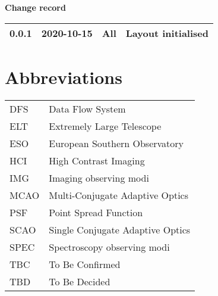 
\dmdmaketitle


\begin{center}
  \textbf{Change record}

  \tabletail{\hline}

  \begin{supertabular}{|l|l|l|l|}
   0.0.1 & 2020-10-15 & All & Layout initialised \\
   \hline
  \end{supertabular}

\end{center}


\setcounter{tocdepth}{3}
\tableofcontents
\cleardoublepage



\section*{Abbreviations}
\label{sec:abbreviations}


\tablehead{}
\tabletail{}
\begin{supertabular}{ll}
  DFS & Data Flow System \\
  ELT & Extremely Large Telescope \\
  ESO & European Southern Observatory \\
  HCI & High Contrast Imaging \\
  IMG & Imaging observing modi \\
  MCAO & Multi-Conjugate Adaptive Optics \\
  PSF & Point Spread Function \\
  SCAO & Single Conjugate Adaptive Optics \\
  SPEC & Spectroscopy observing modi \\
  TBC & To Be Confirmed \\
  TBD & To Be Decided \\
\end{supertabular}


